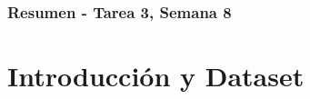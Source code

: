 \documentclass[10pt]{beamer}
\begin{document}
\myfront{}

\begin{frame}
  \titlepage
\end{frame}

\begin{frame}
  \frametitle{Resumen - Tarea 3, Semana 8}
  \tableofcontents
\end{frame}


\section{Introducción y Dataset}
\end{document}
